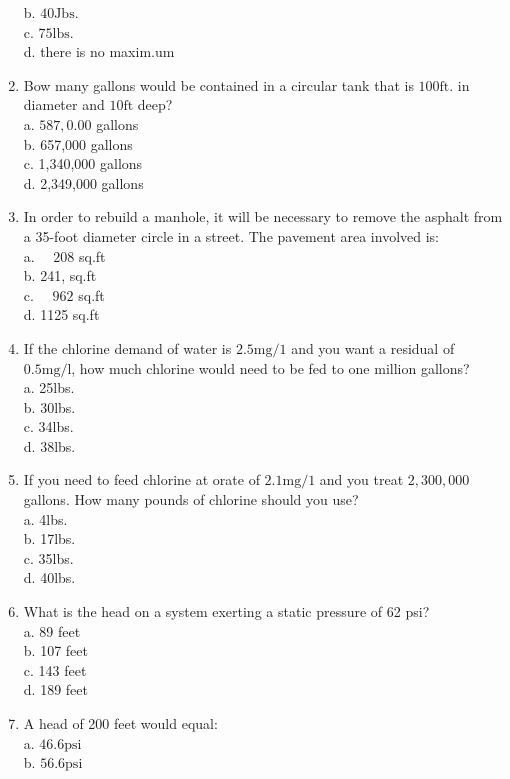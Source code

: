 \begin{enumerate}
b. $40 \mathrm{Jbs}$.\\
c. $75 \mathrm{lbs}$.\\
d. there is no maxim.um\\
\item Bow many gallons would be contained in a circular tank that is $100 \mathrm{ft}$. in diameter and $10 \mathrm{ft}$ deep?\\
a. $587,0.00$ gallons\\
b. 657,000 gallons\\
c. 1,340,000 gallons\\
d. 2,349,000 gallons\\
\item In order to rebuild a manhole, it will be necessary to remove the asphalt from a 35-foot diameter circle in a street. The pavement area involved is:\\
a. $\quad 208$ sq.ft\\
b. 241, sq.ft\\
c. $\quad 962$ sq.ft\\
d. 1125 sq.ft\\
\item If the chlorine demand of water is $2.5 \mathrm{mg} / 1$ and you want a residual of $0.5 \mathrm{mg} / \mathrm{l}$, how much chlorine would need to be fed to one million gallons?\\
a. 25lbs.\\
b. 30lbs.\\
c. 34lbs.\\
d. 38lbs.\\
\item If you need to feed chlorine at orate of $2.1 \mathrm{mg} / 1$ and you treat $2,300,000$ gallons. How many pounds of chlorine should you use?\\
a. 4lbs.\\
b. 17lbs.\\
c. 35lbs.\\
d. 40lbs.\\
\item What is the head on a system exerting a static pressure of 62 psi?\\
a. 89 feet\\
b. 107 feet\\
c. 143 feet\\
d. 189 feet\\
\item A head of 200 feet would equal:\\
a. $46.6 \mathrm{psi}$\\
b. $56.6 \mathrm{psi}$\\

\end{enumerate}
